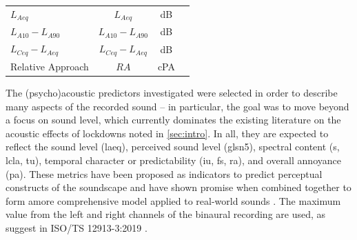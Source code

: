 \begin{table}[h!]
\begin{tabular}{lccl}
      $L_{Aeq}$                                                               & $L_{Aeq}$         & dB            & \citet{IEC61672Part1}      \\
      $L_{A10}-L_{A90}$                                                         & $L_{A10}-L_{A90}$   & dB            & \citet{ISO1996Part1}             \\
      $L_{Ceq}-L_{Aeq}$                                                         & $L_{Ceq}-L_{Aeq}$   & dB            & \citet{ISO1996Part1}             \\
      Relative Approach                                                     & $RA$            & cPA           & \citet{Sottek2005Models}          \\
      \bottomrule
    \end{tabular}
\end{table}

   The (psycho)acoustic predictors investigated were selected in order to describe many aspects of the recorded sound -- in particular, the goal was to move beyond a focus on sound level, which currently dominates the existing literature on the acoustic effects of lockdowns noted in \ref{sec:intro}. In all, they are expected to reflect the sound level (\gls{laeq}), perceived sound level (gls{n5}), spectral content (\gls{s}, \gls{lcla}, \gls{tu}), temporal character or predictability (\gls{iu}, \gls{fs}, \gls{ra}), and overall annoyance (\gls{pa}). These metrics have been proposed as indicators to predict perceptual constructs of the soundscape \citep{Aletta2017Dimensions, Aletta2016Soundscape} and have shown promise when combined together to form amore comprehensive model applied to real-world sounds \citep{Orga2021Multilevel}. The maximum value from the left and right channels of the binaural recording are used, as suggest in ISO/TS 12913-3:2019 \citep{ISO12913Part3}.




